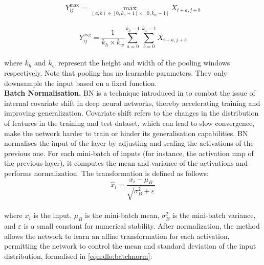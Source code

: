 
\begin{equation}
  \label{eqn:dlo:max_pooling}
  Y^{\text{max}}_{ij} = \max_{(a,b) \in [0, k_h-1] \times [0, k_w-1]} X_{i + a, j + b}
\end{equation}\\

  \begin{equation}
  \label{eqn:dlo:avg_pooling}
  Y^{\text{avg}}_{ij} = \frac{1}{k_h \times k_w} \sum_{a=0}^{k_h-1} \sum_{b=0}^{k_w-1} X_{i + a, j + b}  
\end{equation}\\

\noindent where $k_h$ and $k_w$ represent the height and width of the pooling
windows respectively. Note that pooling has no learnable parameters. They only
downsample the input based on a fixed function.\\


\noindent \textbf{Batch Normalisation.} \ac{BN} is a technique introduced in
\cite{DBLP:conf/icml/IoffeS15} to combat the issue of internal covariate shift
in deep neural networks, thereby accelerating training and improving
generalization. Covariate shift refers to the changes in the distribution of
features in the training and test dataset, which can lead to slow convergence,
make the network harder to train or hinder its generalisation capabilities.
\ac{BN} normalises the input of the layer by adjusting and scaling the
activations of the previous one. For each mini-batch of inputs (for instance,
the activation map of the previous layer), it computes the mean and variance of
the activations and performs normalization. The transformation is defined as
follows:\\

\begin{equation}
  \label{eqn:dlo:batchnorm}
  \hat{x}_{i} = \frac{x_{i} - \mu_{B}}{\sqrt{\sigma_{B}^{2} + \varepsilon}}
\end{equation}\\

\noindent where $x_{i}$ is the input, $\mu_{B}$ is the mini-batch mean,
$\sigma_{B}^{2}$ is the mini-batch variance, and $\varepsilon$ is a small
constant for numerical stability. After normalization, the method allows the
network to learn an affine transformation for each activation, permitting the
network to control the mean and standard deviation of the input distribution,
formalised in \cref{eqn:dlo:batchnorm}:\\

